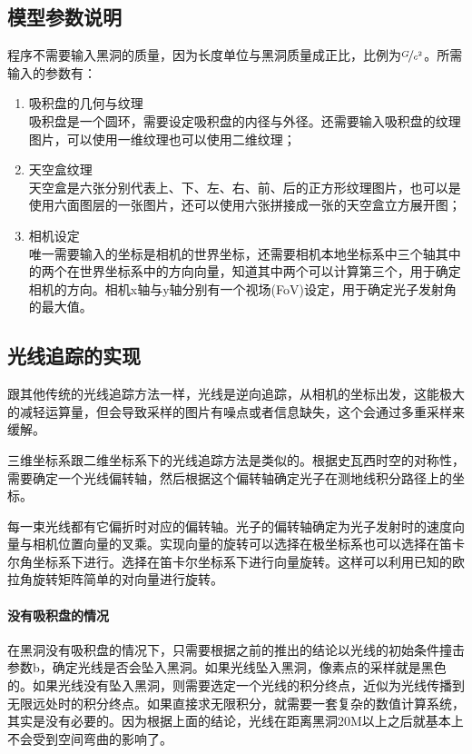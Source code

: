 \subsection{模型参数说明}
程序不需要输入黑洞的质量，因为长度单位与黑洞质量成正比，比例为$\nicefrac{G}{c^2}$。所需输入的参数有：
\begin{enumerate}
    \item 吸积盘的几何与纹理 \\ 吸积盘是一个圆环，需要设定吸积盘的内径与外径。还需要输入吸积盘的纹理图片，可以使用一维纹理也可以使用二维纹理；
    \item 天空盒纹理 \\ 天空盒是六张分别代表上、下、左、右、前、后的正方形纹理图片，也可以是使用六面图层的一张图片，还可以使用六张拼接成一张的天空盒立方展开图；
    \item 相机设定 \\ 唯一需要输入的坐标是相机的世界坐标，还需要相机本地坐标系中三个轴其中的两个在世界坐标系中的方向向量，知道其中两个可以计算第三个，用于确定相机的方向。相机x轴与y轴分别有一个视场(FoV)设定，用于确定光子发射角的最大值。
\end{enumerate}


\subsection{光线追踪的实现}
跟其他传统的光线追踪方法一样，光线是逆向追踪，从相机的坐标出发，这能极大的减轻运算量，但会导致采样的图片有噪点或者信息缺失，这个会通过多重采样来缓解。

三维坐标系跟二维坐标系下的光线追踪方法是类似的。根据史瓦西时空的对称性，需要确定一个光线偏转轴，然后根据这个偏转轴确定光子在测地线积分路径上的坐标。

每一束光线都有它偏折时对应的偏转轴。光子的偏转轴确定为光子发射时的速度向量与相机位置向量的叉乘。实现向量的旋转可以选择在极坐标系也可以选择在笛卡尔角坐标系下进行。选择在笛卡尔坐标系下进行向量旋转。这样可以利用已知的欧拉角旋转矩阵简单的对向量进行旋转。

\paragraph{没有吸积盘的情况}
在黑洞没有吸积盘的情况下，只需要根据之前的推出的结论以光线的初始条件撞击参数b，确定光线是否会坠入黑洞。如果光线坠入黑洞，像素点的采样就是黑色的。如果光线没有坠入黑洞，则需要选定一个光线的积分终点，近似为光线传播到无限远处时的积分终点。如果直接求无限积分，就需要一套复杂的数值计算系统，其实是没有必要的。因为根据上面的结论，光线在距离黑洞20M以上之后就基本上不会受到空间弯曲的影响了。

